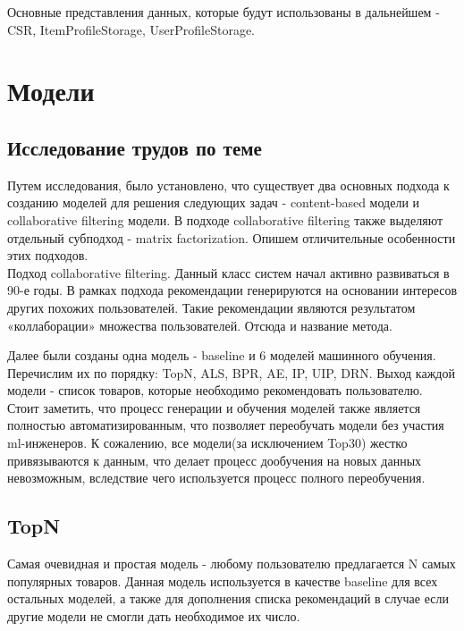 \documentclass[14pt]{mmcs_article}
\begin{document}
Основные представления данных, которые будут использованы в дальнейшем - CSR, ItemProfileStorage, UserProfileStorage.


\section{Модели}\label{dsfs}
\subsection{Исследование трудов по теме}
Путем исследования, было установлено, что существует два основных подхода к созданию моделей для решения следующих задач - content-based модели и collaborative filtering модели. В подходе collaborative filtering также выделяют отдельный субподход - matrix factorization.  Опишем отличительные особенности этих подходов. \\

Подход collaborative filtering. Данный класс систем начал активно развиваться в 90-е годы. В рамках подхода рекомендации генерируются на основании интересов других похожих пользователей. Такие рекомендации являются результатом «коллаборации» множества пользователей. Отсюда и название метода.


Далее были созданы одна модель - baseline и 6 моделей машинного обучения. Перечислим их по порядку: TopN, ALS, BPR, AE, IP, UIP, DRN. Выход каждой модели - список товаров, которые необходимо рекомендовать пользователю. \\
Стоит заметить, что процесс генерации и обучения моделей также является полностью автоматизированным, что позволяет переобучать модели без участия ml-инженеров. К сожалению, все модели(за исключением Top30) жестко привязываются к данным, что делает процесс дообучения на новых данных невозможным, вследствие чего используется процесс полного переобучения.
\subsection{TopN}
Самая очевидная и простая модель - любому пользователю предлагается N самых популярных товаров. Данная модель используется в качестве baseline для всех остальных моделей, а также для дополнения списка рекомендаций в случае если другие модели не смогли дать необходимое их число.
\end{document}
